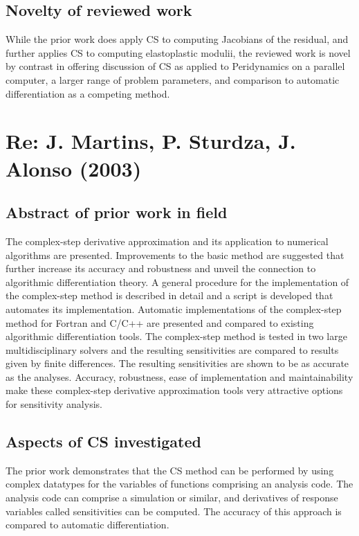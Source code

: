 \documentclass[10pt,letterpaper,draft]{article}
\begin{document}
\subsection{Novelty of reviewed work}

While the prior work does apply CS to computing Jacobians of the residual, and further applies CS
to computing elastoplastic modulii, the reviewed work is novel by contrast in offering discussion
of CS as applied to Peridynamics on a parallel computer, a larger range of problem parameters, 
and comparison to automatic differentiation as a competing method. 


\section{Re: J. Martins, P. Sturdza, J. Alonso (2003)}
\subsection{Abstract of prior work in field}

The complex-step derivative approximation and its application to numerical
algorithms are presented. Improvements to the basic method are suggested that
further increase its accuracy and robustness and unveil the connection to
algorithmic differentiation theory. A general procedure for the implementation
of the complex-step method is described in detail and a script is developed
that automates its implementation. Automatic implementations of the
complex-step method for Fortran and C/C++ are presented and compared to
existing algorithmic differentiation tools. The complex-step method is tested
in two large multidisciplinary solvers and the resulting sensitivities are
compared to results given by finite differences. The resulting sensitivities
are shown to be as accurate as the analyses. Accuracy, robustness, ease of
implementation and maintainability make these complex-step derivative
approximation tools very attractive options for sensitivity analysis.

\subsection{Aspects of CS investigated}

The prior work demonstrates that the CS method can be performed by using complex
datatypes for the variables of functions comprising an analysis code. The analysis code
can comprise a simulation or similar, and derivatives of response variables called
sensitivities can be computed. The accuracy of this approach is compared to automatic 
differentiation.
\end{document}
